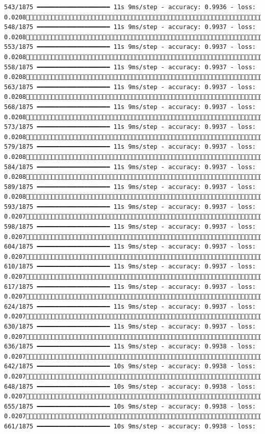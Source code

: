 \documentclass[
  letterpaper,
  DIV=11,
  numbers=noendperiod]{scrreprt}
\begin{document}
\begin{verbatim}
543/1875 ━━━━━━━━━━━━━━━━━━━━ 11s 9ms/step - accuracy: 0.9936 - loss: 0.0208 548/1875 ━━━━━━━━━━━━━━━━━━━━ 11s 9ms/step - accuracy: 0.9937 - loss: 0.0208 553/1875 ━━━━━━━━━━━━━━━━━━━━ 11s 9ms/step - accuracy: 0.9937 - loss: 0.0208 558/1875 ━━━━━━━━━━━━━━━━━━━━ 11s 9ms/step - accuracy: 0.9937 - loss: 0.0208 563/1875 ━━━━━━━━━━━━━━━━━━━━ 11s 9ms/step - accuracy: 0.9937 - loss: 0.0208 568/1875 ━━━━━━━━━━━━━━━━━━━━ 11s 9ms/step - accuracy: 0.9937 - loss: 0.0208 573/1875 ━━━━━━━━━━━━━━━━━━━━ 11s 9ms/step - accuracy: 0.9937 - loss: 0.0208 579/1875 ━━━━━━━━━━━━━━━━━━━━ 11s 9ms/step - accuracy: 0.9937 - loss: 0.0208 584/1875 ━━━━━━━━━━━━━━━━━━━━ 11s 9ms/step - accuracy: 0.9937 - loss: 0.0208 589/1875 ━━━━━━━━━━━━━━━━━━━━ 11s 9ms/step - accuracy: 0.9937 - loss: 0.0208 593/1875 ━━━━━━━━━━━━━━━━━━━━ 11s 9ms/step - accuracy: 0.9937 - loss: 0.0207 598/1875 ━━━━━━━━━━━━━━━━━━━━ 11s 9ms/step - accuracy: 0.9937 - loss: 0.0207 604/1875 ━━━━━━━━━━━━━━━━━━━━ 11s 9ms/step - accuracy: 0.9937 - loss: 0.0207 610/1875 ━━━━━━━━━━━━━━━━━━━━ 11s 9ms/step - accuracy: 0.9937 - loss: 0.0207 617/1875 ━━━━━━━━━━━━━━━━━━━━ 11s 9ms/step - accuracy: 0.9937 - loss: 0.0207 624/1875 ━━━━━━━━━━━━━━━━━━━━ 11s 9ms/step - accuracy: 0.9937 - loss: 0.0207 630/1875 ━━━━━━━━━━━━━━━━━━━━ 11s 9ms/step - accuracy: 0.9937 - loss: 0.0207 636/1875 ━━━━━━━━━━━━━━━━━━━━ 11s 9ms/step - accuracy: 0.9938 - loss: 0.0207 642/1875 ━━━━━━━━━━━━━━━━━━━━ 10s 9ms/step - accuracy: 0.9938 - loss: 0.0207 648/1875 ━━━━━━━━━━━━━━━━━━━━ 10s 9ms/step - accuracy: 0.9938 - loss: 0.0207 655/1875 ━━━━━━━━━━━━━━━━━━━━ 10s 9ms/step - accuracy: 0.9938 - loss: 0.0207 661/1875 ━━━━━━━━━━━━━━━━━━━━ 10s 9ms/step - accuracy: 0.9938 - loss: 
\end{verbatim}
\end{document}

